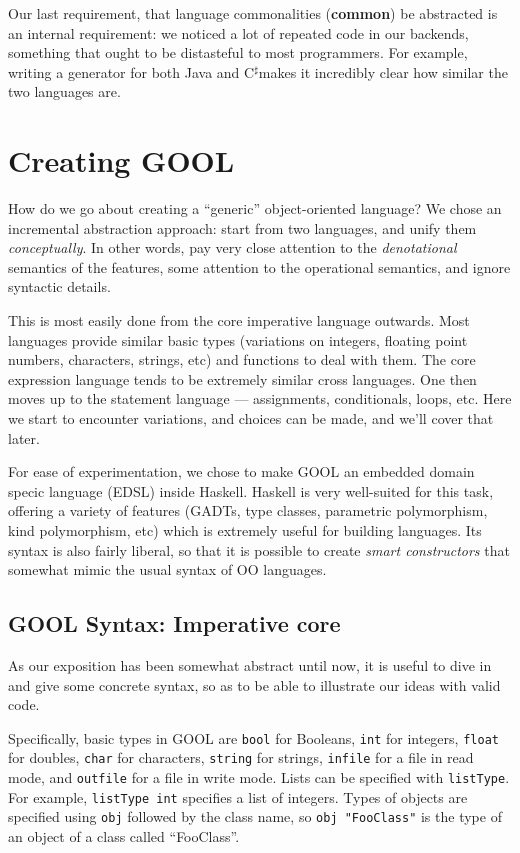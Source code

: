 \documentclass[sigplan,review,anonymous,prologue,dvipsnames]{acmart}
\newcommand{\Csharp}{C$^{\sharp}$}
\newcommand{\abbrev}[1]{\textbf{#1}}
\newcommand{\common}{\abbrev{common}}
\begin{document}
Our last requirement, that language commonalities (\common) be abstracted is
an internal requirement: we noticed a lot of repeated code in our backends, 
something that ought to be distasteful to most programmers. For example, writing
a generator for both Java and \Csharp makes it incredibly clear how similar the two
languages are.

\section{Creating GOOL} \label{sec:creating}

How do we go about creating a ``generic'' object-oriented language?
We chose an incremental abstraction approach: start from two languages,
and unify them \emph{conceptually}.  In other words, pay very close
attention to the \emph{denotational} semantics of the features, some
attention to the operational semantics, and ignore syntactic details.

This is most easily done from the core imperative language outwards.
Most languages provide similar basic types (variations on integers,
floating point numbers, characters, strings, etc) and functions to deal
with them. The core expression language tends to be extremely similar
cross languages. One then moves up to the statement language ---
assignments, conditionals, loops, etc.  Here we start to encounter
variations, and choices can be made, and we'll cover that later.

For ease of experimentation, we chose to make GOOL an embedded
domain specic language (EDSL) inside Haskell.  Haskell is very well-suited
for this task, offering a variety of features (GADTs, type classes,
parametric polymorphism, kind polymorphism, etc) which is extremely useful
for building languages.  Its syntax is also fairly liberal, so that it is
possible to create \emph{smart constructors} that somewhat mimic the
usual syntax of OO languages.

\subsection{GOOL Syntax: Imperative core} \label{ssec:syntax}

As our exposition has been somewhat abstract until now, it is useful to
dive in and give some concrete syntax, so as to be able to illustrate
our ideas with valid code.

Specifically, basic types in GOOL are \verb|bool| for Booleans, 
\verb|int| for integers, \verb|float| for doubles, \verb|char| 
for characters, \verb|string| for strings, \verb|infile| for a file 
in read mode, and \verb|outfile| for a file in write mode. Lists can be 
specified with \verb|listType|. For example, \verb|listType int| 
specifies a list of integers. Types of objects are specified using 
\verb|obj| followed by the class name, so \verb|obj "FooClass"| is the type of 
an object of a class called ``FooClass''. 
\end{document}
